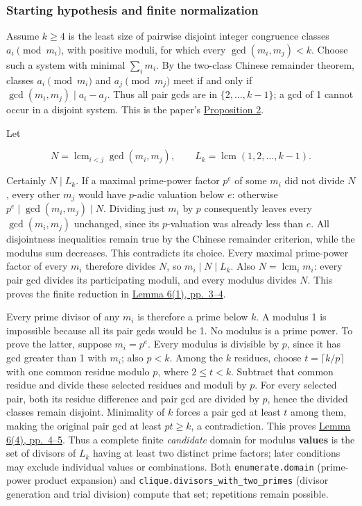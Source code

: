\documentclass[11pt,a4paper]{article}
\begin{document}
\subsubsection{Starting hypothesis and finite normalization}\label{starting-hypothesis-and-finite-normalization}

Assume \(k\ge4\) is the least size of pairwise disjoint integer congruence classes \(a_i\pmod{m_i}\), with positive moduli, for which every \(\gcd(m_i,m_j)<k\). Choose such a system with minimal \(\sum_i m_i\). By the two-class Chinese remainder theorem, classes \(a_i\pmod{m_i}\) and \(a_j\pmod{m_j}\) meet if and only if \(\gcd(m_i,m_j)\mid a_i-a_j\). Thus all pair gcds are in \(\{2,\ldots,k-1\}\); a gcd of 1 cannot occur in a disjoint system. This is the paper's \href{https://arxiv.org/pdf/math/0604347v2}{Proposition 2}.

Let

\[
  N=\operatorname{lcm}_{i<j}\gcd(m_i,m_j),\qquad
  L_k=\operatorname{lcm}(1,2,\ldots,k-1).
\]

Certainly \(N\mid L_k\). If a maximal prime-power factor \(p^e\) of some \(m_i\) did not divide \(N\), every other \(m_j\) would have \(p\)-adic valuation below \(e\): otherwise \(p^e\mid\gcd(m_i,m_j)\mid N\). Dividing just \(m_i\) by \(p\) consequently leaves every \(\gcd(m_i,m_j)\) unchanged, since its \(p\)-valuation was already less than \(e\). All disjointness inequalities remain true by the Chinese remainder criterion, while the modulus sum decreases. This contradicts its choice. Every maximal prime-power factor of every \(m_i\) therefore divides \(N\), so \(m_i\mid N\mid L_k\). Also \(N=\operatorname{lcm}_i m_i\): every pair gcd divides its participating moduli, and every modulus divides \(N\). This proves the finite reduction in \href{https://arxiv.org/pdf/math/0604347v2}{Lemma 6(1), pp.~3--4}.

Every prime divisor of any \(m_i\) is therefore a prime below \(k\). A modulus 1 is impossible because all its pair gcds would be 1. No modulus is a prime power. To prove the latter, suppose \(m_i=p^e\). Every modulus is divisible by \(p\), since it has gcd greater than 1 with \(m_i\); also \(p<k\). Among the \(k\) residues, choose \(t=\lceil k/p\rceil\) with one common residue modulo \(p\), where \(2\le t<k\). Subtract that common residue and divide these selected residues and moduli by \(p\). For every selected pair, both its residue difference and pair gcd are divided by \(p\), hence the divided classes remain disjoint. Minimality of \(k\) forces a pair gcd at least \(t\) among them, making the original pair gcd at least \(pt\ge k\), a contradiction. This proves \href{https://arxiv.org/pdf/math/0604347v2}{Lemma 6(4), pp.~4--5}. Thus a complete finite \emph{candidate} domain for modulus \textbf{values} is the set of divisors of \(L_k\) having at least two distinct prime factors; later conditions may exclude individual values or combinations. Both \texttt{enumerate.domain} (prime-power product expansion) and \texttt{clique.divisors\_with\_two\_primes} (divisor generation and trial division) compute that set; repetitions remain possible.
\end{document}
